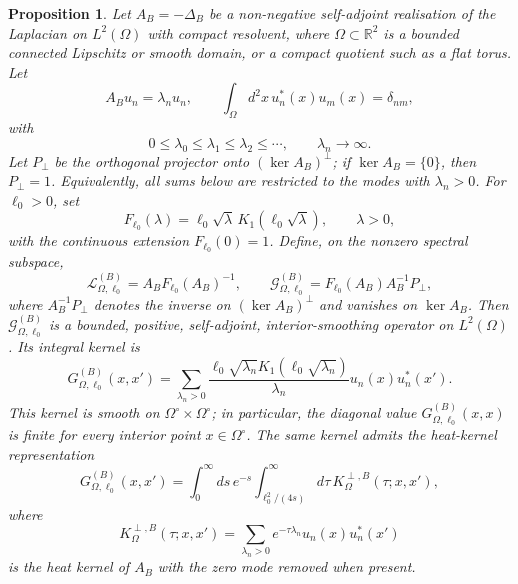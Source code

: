 \documentclass[nopacs,amsmath,amsfonts,amssymb,aps,superscriptaddress]{revtex4}
\newtheorem{proposition}{Proposition}[section]
\begin{document}
\begin{proposition}\label{prop:spectral-td-green}
Let $A_B=-\Delta_B$ be a non-negative self-adjoint realisation of the Laplacian on $L^2(\Omega)$ with compact resolvent, where $\Omega\subset\mathbb R^2$ is a bounded connected Lipschitz or smooth domain, or a compact quotient such as a flat torus. Let
\begin{equation}
  A_B u_n=\lambda_n u_n,
  \qquad
  \int_\Omega d^2x\,u_n^*(x)u_m(x)=\delta_{nm},
\end{equation}
with
\begin{equation}
  0\leq\lambda_0\leq\lambda_1\leq\lambda_2\leq\cdots,
  \qquad
  \lambda_n\to\infty.
\end{equation}
Let $P_\perp$ be the orthogonal projector onto $(\ker A_B)^\perp$; if $\ker A_B=\{0\}$, then $P_\perp=1$. Equivalently, all sums below are restricted to the modes with $\lambda_n>0$. For $\ell_0>0$, set
\begin{equation}
  F_{\ell_0}(\lambda)=\ell_0\sqrt{\lambda}\,K_1\!\left(\ell_0\sqrt{\lambda}\right),
  \qquad \lambda>0,
\end{equation}
with the continuous extension $F_{\ell_0}(0)=1$. Define, on the nonzero spectral subspace,
\begin{equation}
  \mathcal L_{\Omega,\ell_0}^{(B)}
  =A_B F_{\ell_0}(A_B)^{-1},
  \qquad
  \mathcal G_{\Omega,\ell_0}^{(B)}
  =F_{\ell_0}(A_B)A_B^{-1}P_\perp,
\end{equation}
where $A_B^{-1}P_\perp$ denotes the inverse on $(\ker A_B)^\perp$ and vanishes on $\ker A_B$. Then $\mathcal G_{\Omega,\ell_0}^{(B)}$ is a bounded, positive, self-adjoint, interior-smoothing operator on $L^2(\Omega)$. Its integral kernel is
\begin{equation}\label{GB}
  G_{\Omega,\ell_0}^{(B)}(x,x')
  =\sum_{\lambda_n>0}
  \frac{\ell_0\sqrt{\lambda_n}K_1\!\left(\ell_0\sqrt{\lambda_n}\right)}{\lambda_n}
  u_n(x)u_n^*(x').
\end{equation}
This kernel is smooth on $\Omega^\circ\times\Omega^\circ$; in particular, the diagonal value $G_{\Omega,\ell_0}^{(B)}(x,x)$ is finite for every interior point $x\in\Omega^\circ$. The same kernel admits the heat-kernel representation
\begin{equation}
  G_{\Omega,\ell_0}^{(B)}(x,x')
  =\int_0^\infty ds\,e^{-s}
  \int_{\ell_0^2/(4s)}^\infty d\tau\,
  K_\Omega^{\perp,B}(\tau;x,x'),
\end{equation}
where
\begin{equation}
  K_\Omega^{\perp,B}(\tau;x,x')
  =\sum_{\lambda_n>0}e^{-\tau\lambda_n}u_n(x)u_n^*(x')
\end{equation}
is the heat kernel of $A_B$ with the zero mode removed when present.
\end{proposition}
\end{document}
